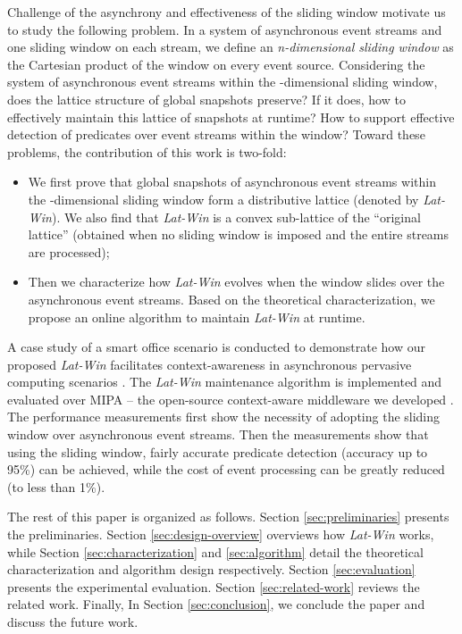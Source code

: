 \documentclass[12pt,journal,letterpaper,compsoc]{IEEEtran}
\begin{document}
Challenge of the asynchrony and effectiveness of the sliding window motivate us to study the following problem. In a system of  asynchronous event streams and one sliding window on each stream, we define an {\it n-dimensional sliding window} as the Cartesian product of the window on every event source. Considering the system of asynchronous event streams within the -dimensional sliding window, does the lattice structure of global snapshots preserve? If it does, how to effectively maintain this lattice of snapshots at runtime? How to support effective detection of predicates over event streams within the window? Toward these problems, the contribution of this work is two-fold:
\begin{itemize}
  \item We first prove that global snapshots of asynchronous event streams within the -dimensional sliding window form a distributive lattice (denoted by {\it Lat-Win}). We also find that {\it Lat-Win} is a convex sub-lattice of the ``original lattice'' (obtained when no sliding window is imposed and the entire streams are processed);
  \item Then we characterize how {\it Lat-Win} evolves when the window slides over the asynchronous event streams. Based on the theoretical characterization, we propose an online algorithm to maintain {\it Lat-Win} at runtime.
\end{itemize}

A case study of a smart office scenario is conducted to demonstrate how our proposed {\it Lat-Win} facilitates context-awareness in asynchronous pervasive computing scenarios \cite{Huang09, Huang11}. The {\it Lat-Win} maintenance algorithm is implemented and evaluated over MIPA -- the open-source context-aware middleware we developed \cite{MIPA, Huang10b, Huang11}. The performance measurements first show the necessity of adopting the sliding window over asynchronous event streams. Then the measurements show that using the sliding window, fairly accurate predicate detection (accuracy up to 95\%) can be achieved, while the cost of event processing can be greatly reduced (to less than 1\%).

The rest of this paper is organized as follows. Section \ref{sec:preliminaries} presents the preliminaries. Section \ref{sec:design-overview} overviews how {\it Lat-Win} works, while Section \ref{sec:characterization} and \ref{sec:algorithm} detail the theoretical characterization and algorithm design respectively. Section \ref{sec:evaluation} presents the experimental evaluation. Section \ref{sec:related-work} reviews the related work. Finally, In Section \ref{sec:conclusion}, we conclude the paper and discuss the future work.
\end{document}
